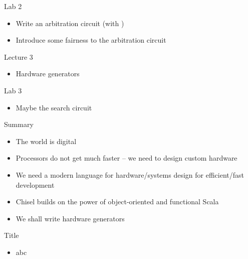 \begin{frame}[fragile]{Lab 2}
\begin{itemize}
\item Write an arbitration circuit (with )
\item Introduce some fairness to the arbitration circuit
\end{itemize}
\end{frame}

\begin{frame}[fragile]{Lecture 3}
\begin{itemize}
\item Hardware generators
\end{itemize}
\end{frame}

\begin{frame}[fragile]{Lab 3}
\begin{itemize}
\item Maybe the search circuit
\end{itemize}
\end{frame}

\begin{frame}[fragile]{Summary}
\begin{itemize}
\item The world is digital
\item Processors do not get much faster -- we need to design custom hardware
\item We need a modern language for hardware/systems design for efficient/fast development
\item Chisel builds on the power of object-oriented and functional Scala
\item We shall write hardware generators
\end{itemize}
\end{frame}




\begin{frame}[fragile]{Title}
\begin{itemize}
\item abc
\end{itemize}
\end{frame}
